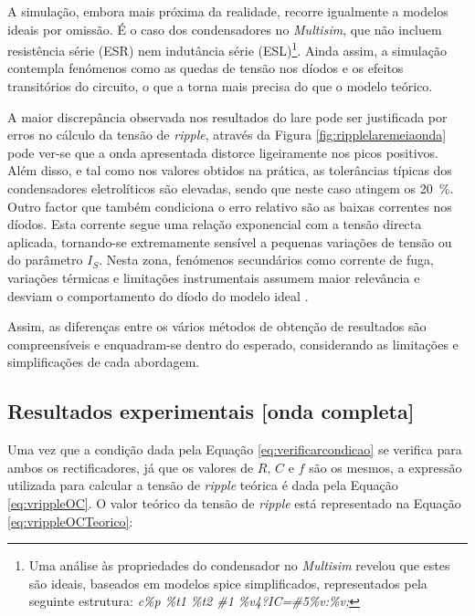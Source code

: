 A simulação, embora mais próxima da realidade, recorre igualmente a modelos ideais por omissão. É o caso dos condensadores no \textit{Multisim}, que não incluem resistência série (ESR) nem indutância série (ESL)\footnote{Uma análise às propriedades do condensador no \textit{Multisim} revelou que estes são ideais, baseados em modelos \acrshort{spice} simplificados, representados pela seguinte estrutura: \textit{c\%p \%t1 \%t2 \#1 \%v4?IC=\#5\%v:\%v;}}. Ainda assim, a simulação contempla fenómenos como as quedas de tensão nos díodos e os efeitos transitórios do circuito, o que a torna mais precisa do que o modelo teórico.

A maior discrepância observada nos resultados do \acrshort{lare} pode ser justificada por erros no cálculo da tensão de \textit{ripple}, através da Figura \ref{fig:ripplelaremeiaonda} pode ver-se que a onda apresentada distorce ligeiramente nos picos positivos. Além disso, e tal como nos valores obtidos na prática, as tolerâncias típicas dos condensadores eletrolíticos são elevadas, sendo que neste caso atingem os \SI{20}{\percent}\cite{toleranciacondensadores}. Outro factor que também condiciona o erro relativo são as baixas correntes nos díodos. Esta corrente segue uma relação exponencial com a tensão directa aplicada, tornando-se extremamente sensível a pequenas variações de tensão ou do parâmetro $I_{S}$. Nesta zona, fenómenos secundários como corrente de fuga, variações térmicas e limitações instrumentais assumem maior relevância e desviam o comportamento do díodo do modelo ideal \cite{sedrasmith}.

Assim, as diferenças entre os vários métodos de obtenção de resultados são compreensíveis e enquadram-se dentro do esperado, considerando as limitações e simplificações de cada abordagem.

\subsection{Resultados experimentais [onda completa]}
\label{sec:resultados_RectificadoresOndacompleta}
Uma vez que a condição dada pela Equação \ref{eq:verificarcondicao} se verifica para ambos os rectificadores, já que os valores de $R$, $C$ e $f$ são os mesmos, a expressão utilizada para calcular a tensão de \textit{ripple} teórica é dada pela Equação \ref{eq:vrippleOC}. O valor teórico da tensão de \textit{ripple} está representado na Equação \ref{eq:vrippleOCTeorico}:

